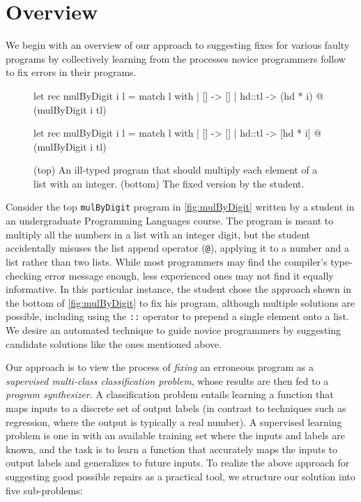 \section{Overview}
\label{sec:overview}

We begin with an overview of our approach to suggesting fixes for various faulty
programs by collectively learning from the processes novice programmers follow
to fix errors in their programs.

\begin{figure}[ht]
\begin{ecode}
let rec mulByDigit i l =
  match l with
  | []     -> []
  | hd::tl -> (hd * i) @ (mulByDigit i tl)
\end{ecode}

\begin{ecode}
let rec mulByDigit i l =
  match l with
  | []     -> []
  | hd::tl -> [hd * i] @ (mulByDigit i tl)
\end{ecode}
\caption{(top) An ill-typed \ocaml program that should multiply each element
of a list with an integer. (bottom) The fixed version by the student.}
\label{fig:mulByDigit}
\end{figure}


 Consider the top \texttt{mulByDigit} program in
\autoref{fig:mulByDigit} written by a student in an undergraduate Programming
Languages course. The program is meant to multiply all the numbers in a list
with an integer digit, but the student accidentally misuses the list append
operator (\texttt{@}), applying it to a number and a list rather than two lists.
While most programmers may find the compiler's type-checking error message
enough, less experienced ones may not find it equally informative. In this
particular instance, the student chose the approach shown in the bottom of
\autoref{fig:mulByDigit} to fix his program, although multiple solutions are
possible, including using the \texttt{::} operator to prepend a single element
onto a list. We desire an automated technique to guide novice programmers by
suggesting candidate solutions like the ones mentioned above.

 Our approach is to view the process of \emph{fixing} an erroneous
program as a \emph{supervised multi-class classification problem}, whose results
are then fed to a \emph{program synthesizer}. A classification problem entails
learning a function that maps inputs to a discrete set of output labels (in
contrast to techniques such as regression, where the output is typically a real
number). A supervised learning problem is one in with an available training set
where the inputs and labels are known, and the task is to learn a function that
accurately maps the inputs to output labels and generalizes to future inputs. To
realize the above approach for suggesting good possible repairs as a practical
tool, we structure our solution into five sub-problems:


